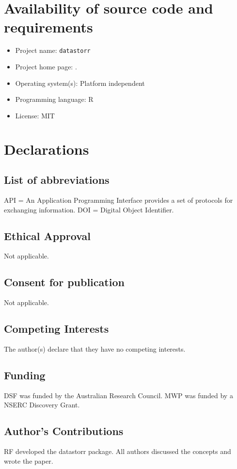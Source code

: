 \documentclass[a4paper,num-refs]{assets/oup-contemporary}
\begin{document}
\section{Availability of source code and requirements}

\begin{itemize}
\item Project name:  \texttt{datastorr} 
\item Project home page: .
\item Operating system(s): Platform independent
\item Programming language: R
\item License: MIT
\end{itemize}

\section{Declarations}

\subsection{List of abbreviations}
API = An Application Programming Interface provides a set of protocols for exchanging information. DOI = Digital Object Identifier.

\subsection{Ethical Approval}
Not applicable.

\subsection{Consent for publication}
Not applicable.
\subsection{Competing Interests}
The author(s) declare that they have no competing interests. 

\subsection{Funding}

DSF was funded by the Australian Research Council. MWP was funded by a NSERC Discovery Grant.

\subsection{Author's Contributions}
RF developed the datastorr package. All authors discussed the concepts and wrote the paper. 
\end{document}
